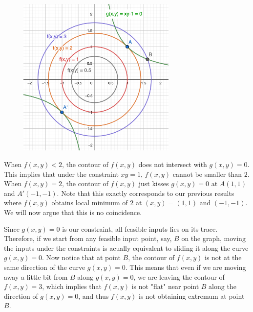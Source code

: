 \begin{figure}[ht]
    \begin{center}
        \includegraphics[width = 0.7\textwidth]{figures/chap 08/Lagrange.png}
    \end{center}
\end{figure}

When $f(x,y) < 2$, the contour of $f(x,y)$ does not intersect with $g(x,y) = 0$.  This implies that under the constraint $xy=1$, $f(x,y)$ cannot be smaller than $2$.  When $f(x,y) = 2$, the contour of $f(x,y)$ just kisses $g(x,y) = 0$ at $A(1,1)$ and $A'(-1,-1)$.  Note that this exactly corresponds to our previous results where $f(x,y)$ obtains local minimum of $2$ at $(x,y) = (1,1)$ and $(-1,-1)$.  We will now argue that this is no coincidence.  

Since $g(x,y) = 0$ is our constraint, all feasible inputs lies on its trace.  Therefore, if we start from any feasible input point, say, $B$ on the graph, moving the inputs under the constraints is acually equivalent to sliding it along the curve $g(x,y) = 0$.  Now notice that at point $B$, the contour of $f(x,y)$ is not at the same direction of the curve $g(x,y) = 0$.  This means that even if we are moving away a little bit from $B$ along $g(x,y) = 0$, we are leaving the contour of $f(x,y) = 3$, which implies that $f(x,y)$ is not "flat" near point $B$ along the direction of $g(x,y) = 0$, and thus $f(x,y)$ is not obtaining extremum at point $B$.  


